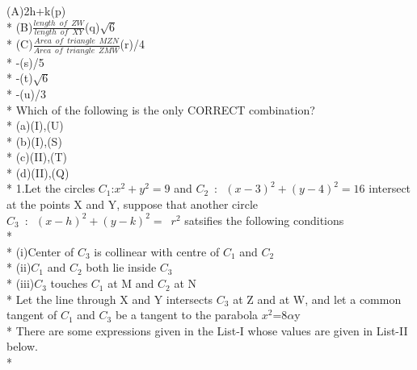 \documentclass{article}
\begin{document}
{\Large\enspace\enspace(A)\enspace 2h+k\enspace\enspace\enspace\enspace\enspace\enspace\enspace\enspace\enspace\enspace\enspace\enspace\enspace\enspace\enspace\enspace\enspace\enspace\enspace\enspace\enspace\enspace(p)\\*
}
{\Large\enspace\enspace(B)\enspace ${\frac{length\enspace of\enspace ZW}{length\enspace of \enspace XY}}$\enspace\enspace\enspace\enspace\enspace\enspace\enspace\enspace\enspace\enspace\enspace\enspace\enspace\enspace\enspace\enspace(q)\enspace $\sqrt6$\\*
}
{\Large\enspace\enspace(C)\enspace ${\frac{Area\enspace of\enspace triangle\enspace MZN}{Area\enspace of \enspace triangle\enspace ZMW}}$\enspace\enspace\enspace\enspace\enspace\enspace\enspace\enspace\enspace\enspace(r)/4\\*
-\enspace\enspace\enspace\enspace\enspace\enspace\enspace\enspace\enspace\enspace\enspace\enspace\enspace\enspace\enspace\enspace\enspace\enspace\enspace\enspace\enspace\enspace\enspace\enspace\enspace\enspace\enspace\enspace\enspace\enspace(s)/5\\*
-\enspace\enspace\enspace\enspace\enspace\enspace\enspace\enspace\enspace\enspace\enspace\enspace\enspace\enspace\enspace\enspace\enspace\enspace\enspace\enspace\enspace\enspace\enspace\enspace\enspace\enspace\enspace\enspace\enspace(t)$\sqrt6$\\*
-\enspace\enspace\enspace\enspace\enspace\enspace\enspace\enspace\enspace\enspace\enspace\enspace\enspace\enspace\enspace\enspace\enspace\enspace\enspace\enspace\enspace\enspace\enspace\enspace\enspace\enspace\enspace\enspace\enspace\enspace(u)/3\\*
}
{Which of the following is the only CORRECT combination?}\\*
{\large (a)\enspace (I),\enspace(U)\\*
(b)\enspace (I),\enspace(S)\\*
(c)\enspace (II),\enspace(T)\\*
(d)\enspace (II),\enspace(Q)\\*
}
{1.Let the circles $C_1$\enspace:\enspace$x^2+y^2=9$ and $C_2\enspace:\enspace (x-3)^2+(y-4)^2=16$ intersect at the  points X and Y, suppose that another circle $C_3\enspace:\enspace (x-h)^2+(y-k)^2=\enspace r^2$ satsifies the following conditions\\*\\*
(i)\enspace Center of $C_3$ is collinear with centre of $C_1$ and $C_2$\\*
(ii)\enspace $C_1$ and $C_2$ both lie inside $C_3$\\*
(iii)\enspace $C_3$ touches $C_1$ at M and $C_2$ at N\\*
Let the line through X and Y intersects $C_3$ at Z and at W, and let a common tangent of $C_1$ and $C_3$ be a tangent to the parabola $x^2$=8$\alpha$y\\*
\enspace There are some expressions given in the List-I whose values are given in List-II below.\\*}
\end{document}
